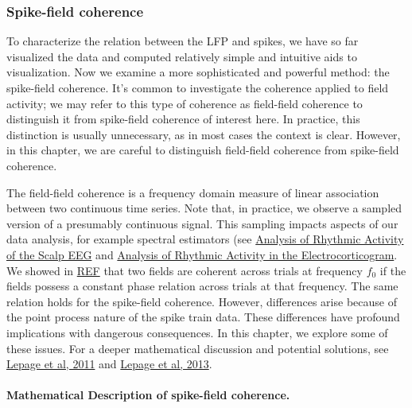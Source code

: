 \documentclass[11pt]{article}
\begin{document}
    \subsubsection{Spike-field coherence}\label{spike-field-coherence}

    To characterize the relation between the LFP and spikes, we have so far
visualized the data and computed relatively simple and intuitive aids to
visualization. Now we examine a more sophisticated and powerful method:
the spike-field coherence. It's common to investigate the coherence
applied to field activity; we may refer to this type of coherence as
field-field coherence to distinguish it from spike-field coherence of
interest here. In practice, this distinction is usually unnecessary, as
in most cases the context is clear. However, in this chapter, we are
careful to distinguish field-field coherence from spike-field coherence.

The field-field coherence is a frequency domain measure of linear
association between two continuous time series. Note that, in practice,
we observe a sampled version of a presumably continuous signal. This
sampling impacts aspects of our data analysis, for example spectral
estimators (see
\href{../Analysis\%20of\%20Rhythmic\%20Activity\%20in\%20the\%20Scalp\%20EEG/Analysis\%20of\%20rhythmic\%20activity\%20in\%20the\%20Scalp\%20EEG.ipynb}{Analysis
of Rhythmic Activity of the Scalp EEG} and
\href{../Analysis\%20of\%20rhythmic\%20activity\%20in\%20the\%20Electrocorticogram/Analysis\%20of\%20rhythmic\%20activity\%20in\%20the\%20Electrocorticogram.ipynb}{Analysis
of Rhythmic Activity in the Electrocorticogram}. We showed in
\href{to\%20add}{REF} that two fields are coherent across trials at
frequency \(f_0\) if the fields possess a constant phase relation across
trials at that frequency. The same relation holds for the spike-field
coherence. However, differences arise because of the point process
nature of the spike train data. These differences have profound
implications with dangerous consequences. In this chapter, we explore
some of these issues. For a deeper mathematical discussion and potential
solutions, see
\href{https://www.ncbi.nlm.nih.gov/pubmed/21671792}{Lepage et al, 2011}
and \href{https://www.ncbi.nlm.nih.gov/pmc/articles/PMC3800189/}{Lepage
et al, 2013}.

    \paragraph{Mathematical Description of spike-field
coherence.}\label{mathematical-description-of-spike-field-coherence.}
\end{document}
